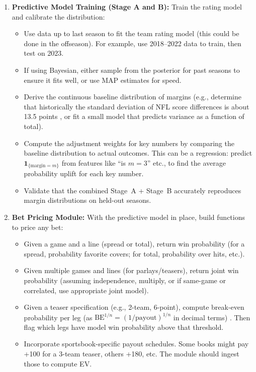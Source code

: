 \documentclass[12pt]{article}
\begin{document}
\begin{enumerate}
    \item \textbf{Predictive Model Training (Stage A and B):} Train the rating model and calibrate the distribution:
    \begin{itemize}
        \item Use data up to last season to fit the team rating model (this could be done in the offseason). For example, use 2018--2022 data to train, then test on 2023.
        \item If using Bayesian, either sample from the posterior for past seasons to ensure it fits well, or use MAP estimates for speed.
        \item Derive the continuous baseline distribution of margins (e.g., determine that historically the standard deviation of NFL score differences is about 13.5 points \cite{Stern1991}, or fit a small model that predicts variance as a function of total).
        \item Compute the adjustment weights for key numbers by comparing the baseline distribution to actual outcomes. This can be a regression: predict $\mathbf{1}_{\{\text{margin}=m\}}$ from features like “is $m=3$” etc., to find the average probability uplift for each key number.
        \item Validate that the combined Stage~A + Stage~B accurately reproduces margin distributions on held-out seasons.
    \end{itemize}
    \item \textbf{Bet Pricing Module:} With the predictive model in place, build functions to price any bet:
    \begin{itemize}
        \item Given a game and a line (spread or total), return win probability (for a spread, probability favorite covers; for total, probability over hits, etc.).
        \item Given multiple games and lines (for parlays/teasers), return joint win probability (assuming independence, multiply, or if same-game or correlated, use appropriate joint model).
        \item Given a teaser specification (e.g., 2-team, 6-point), compute break-even probability per leg (as $\text{BE}^{1/n} = (1/\text{payout})^{1/n}$ in decimal terms) \cite{Andrews2024}. Then flag which legs have model win probability above that threshold.
        \item Incorporate sportsbook-specific payout schedules. Some books might pay +100 for a 3-team teaser, others +180, etc. The module should ingest those to compute EV.

\end{itemize}
\end{enumerate}
\end{document}
